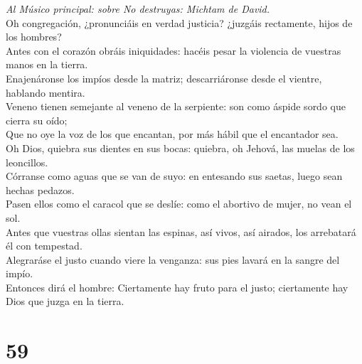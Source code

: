  \emph{Al Músico principal: sobre No destruyas: Michtam de
David.}\\
Oh congregación, ¿pronunciáis en verdad justicia? ¿juzgáis rectamente,
hijos de los hombres?\\
 Antes con el corazón obráis iniquidades: hacéis pesar la
violencia de vuestras manos en la tierra.\\
 Enajenáronse los impíos desde la matriz; descarriáronse
desde el vientre, hablando mentira.\\
 Veneno tienen semejante al veneno de la serpiente: son como
áspide sordo que cierra su oído;\\
 Que no oye la voz de los que encantan, por más hábil que el
encantador sea.\\
 Oh Dios, quiebra sus dientes en sus bocas: quiebra, oh
Jehová, las muelas de los leoncillos.\\
 Córranse como aguas que se van de suyo: en entesando sus
saetas, luego sean hechas pedazos.\\
 Pasen ellos como el caracol que se deslíe: como el abortivo
de mujer, no vean el sol.\\
 Antes que vuestras ollas sientan las espinas, así vivos,
así airados, los arrebatará él con tempestad.\\
 Alegraráse el justo cuando viere la venganza: sus pies
lavará en la sangre del impío.\\
 Entonces dirá el hombre: Ciertamente hay fruto para el
justo; ciertamente hay Dios que juzga en la tierra.

\hypertarget{section-58}{%
\section{59}\label{section-58}}

